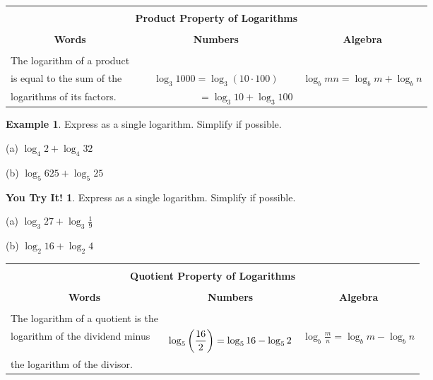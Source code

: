 \documentclass{report}
\theoremstyle{definition}
\newtheorem{example}{\bf Example}
\newtheorem{youtry}{\bf You Try It!}
\begin{document}
\begin{center}
	\begin{tabular}[t]{|c|c|c|}
		\hline
		\multicolumn{3}{|c|}{}\\
		\multicolumn{3}{|c|}{\textbf{Product Property of Logarithms}}\\
		\hline
		&&\\
		\textbf{Words} & \textbf{Numbers} & \textbf{Algebra} \\
		\hline
		&&\\
		\multicolumn{1}{|l|}{The logarithm of a product} & & \\
		\multicolumn{1}{|l|}{is equal to the sum of the } & $\log_3 1000 = \log_3 (10 \cdot 100)   $ &  $\log_b mn = \log_b m+ \log_b n$ \\
		\multicolumn{1}{|l|}{logarithms of its factors.} & $\qquad\qquad\qquad = \log_3 10 + \log_3 100$ & \\
		\hline 
	\end{tabular}
	\normalsize
\end{center}

\begin{example}
Express as a single logarithm. Simplify if possible.
\end{example}
\begin{minipage}[t]{0.45\linewidth}
 (a)  $\log_4 2 + \log_4 32$
\end{minipage}
\begin{minipage}[t]{0.45\linewidth}
 (b) $\log_5 625 + \log_5 25$
\end{minipage}
\vfill

\begin{youtry}
Express as a single logarithm. Simplify if possible.
\end{youtry}
\begin{minipage}[t]{0.45\linewidth}
 (a) $\log_3 27 + \log_3 \displaystyle\frac{1}{9}$
\end{minipage}
\begin{minipage}[t]{0.45\linewidth}
 (b) $\log_2 16 + \log_2 4$
\end{minipage}
\vfill

\begin{center}
	\large
	\begin{tabular}[t]{|c|c|c|}
		\hline
		\multicolumn{3}{|c|}{}\\
		\multicolumn{3}{|c|}{\textbf{Quotient Property of Logarithms}}\\
		\hline
		&&\\
		\textbf{Words} & \textbf{Numbers} & \textbf{Algebra} \\
		\hline
		&&\\
		\multicolumn{1}{|l|}{The logarithm of a quotient is the} & & \\
		\multicolumn{1}{|l|}{ logarithm of the dividend minus } & $\log_5 \displaystyle\bigg{(}\frac{16}{2}\bigg{)} = \log_5 16 - \log_5 2   $ &  $\log_b \frac{m}{n} = \log_b m - \log_b n$ \\
		\multicolumn{1}{|l|}{the logarithm of the divisor.} &  & \\
		\hline 
	\end{tabular}
	\normalsize
\end{center}
\end{document}
